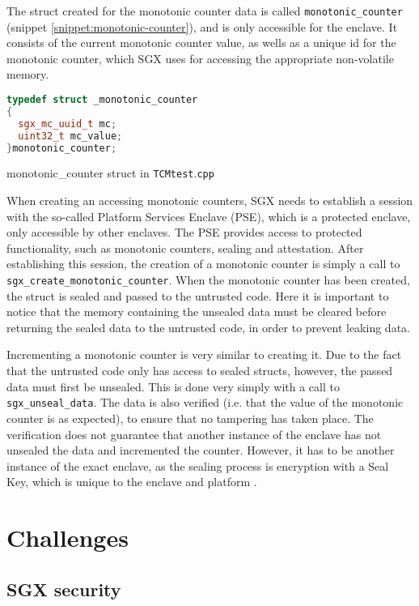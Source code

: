 \documentclass[12pt]{article}
\begin{document}
	The struct created for the monotonic counter data is called \texttt{monotonic\_counter} (snippet \ref{snippet:monotonic-counter}), and is only accessible for the enclave. It consists of the current monotonic counter value, as wells as a unique id for the monotonic counter, which SGX uses for accessing the appropriate non-volatile memory.
	\begin{snippet}[!ht]
		\begin{lstlisting}[language=C++, numbers=none]
typedef struct _monotonic_counter
{
  sgx_mc_uuid_t mc;
  uint32_t mc_value;
}monotonic_counter;
		\end{lstlisting}
		\caption{monotonic\_counter struct in \texttt{TCMtest$.$cpp} \label{snippet:monotonic-counter}}
	\end{snippet}

	When creating an accessing monotonic counters, SGX needs to establish a session with the so-called Platform Services Enclave (PSE), which is a protected enclave, only accessible by other enclaves. The PSE provides access to protected functionality, such as monotonic counters, sealing and attestation.
	After establishing this session, the creation of a monotonic counter is simply a call to \texttt{sgx\_create\_monotonic\_counter}.
	When the monotonic counter has been created, the struct is sealed and passed to the untrusted code. Here it is important to notice that the memory containing the unsealed data must be cleared before returning the sealed data to the untrusted code, in order to prevent leaking data.

	Incrementing a monotonic counter is very similar to creating it. Due to the fact that the untrusted code only has access to sealed structs, however, the passed data must first be unsealed. This is done very simply with a call to \texttt{sgx\_unseal\_data}. The data is also verified (i.e. that the value of the monotonic counter is as expected), to ensure that no tampering has taken place. The verification does not guarantee that another instance of the enclave has not unsealed the data and incremented the counter. However, it has to be another instance of the exact enclave, as the sealing process is encryption with a Seal Key, which is unique to the enclave and platform \cite{sgx-dev-guide}.


	\section{Challenges}

		\subsection{SGX security}
\end{document}
